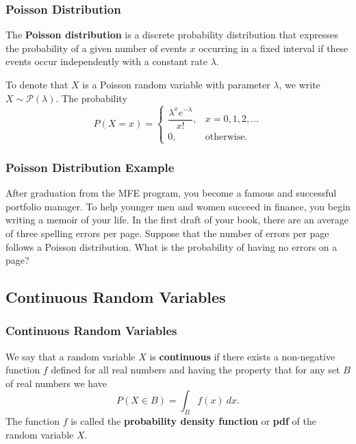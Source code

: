 \documentclass{beamer}
\begin{document}
\begin{frame}
\frametitle{Poisson Distribution}
\begin{Definition} 
The {\bf Poisson distribution} is a discrete probability distribution that expresses the probability of a given number of events $x$ occurring in a fixed interval if these events occur independently with a constant rate $\lambda$.
\end{Definition}
To denote that $X$ is a Poisson random variable with parameter $\lambda$, we write $X\sim{\mathcal{P}(\lambda)}$. The probability 
$$
P(X = x) = \begin{cases} \dfrac{\lambda^x e^{-\lambda}}{x!},&  x = 0, 1, 2,\ldots\\ 0,	&	\text{otherwise.}\end{cases}
$$
\end{frame}

\begin{frame}[t]
\frametitle{Poisson Distribution Example}
\tiny
\begin{Example}
After graduation from the MFE program, you become a famous and successful portfolio manager. To help younger men and women succeed in finance, you begin writing a memoir of your life. In the first draft of your book, there are an average of three spelling errors per page. Suppose that the number of errors per page follows a Poisson distribution. What is the probability of having no errors on a page?
\end{Example}

\end{frame}

\subsection{Continuous Random Variables}

\begin{frame}
\frametitle{Continuous Random Variables}
\begin{Definition}
We say that a random variable $X$ is {\bf continuous} if there exists a non-negative function $f$ defined for all real numbers and having the property that for any set $B$ of real numbers we have
$$
P(X\in B) = \int_B f(x)\ dx.
$$
The function $f$ is called the {\bf probability density function} or {\bf pdf} of the random variable $X$.
\end{Definition}

\end{frame}
\end{document}
